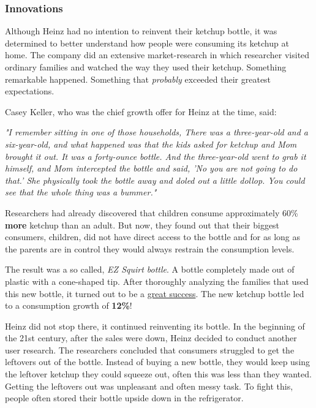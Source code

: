 \subsubsection{Innovations}
Although Heinz had no intention to reinvent their ketchup bottle, it was determined to better understand how people were consuming its ketchup at home. 
The company did an extensive market-research in which researcher visited ordinary families and watched the way they used their ketchup. Something remarkable happened. Something that \textit{probably} exceeded their greatest expectations.

Casey Keller, who was the chief growth offer for Heinz at the time, said: 

\begin{displayquote}
    \textit{
    "I remember sitting in one of those households, There was a three-year-old and a six-year-old, and what happened was that the kids asked for ketchup and Mom brought it out. It was a forty-ounce bottle. And the three-year-old went to grab it himself, and Mom intercepted the bottle and said, 'No you are not going to do that.' She physically took the bottle away and doled out a little dollop. You could see that the whole thing was a bummer."}
\end{displayquote}

Researchers had already discovered that children consume approximately 60\% \textbf{ more} ketchup than an adult. But now, they found out that their biggest consumers, children, did not have direct access to the bottle and for as long as the parents are in control they would always restrain the consumption levels. 

The result was a so called, \textit{EZ Squirt bottle}. A bottle completely made out of plastic with a cone-shaped tip. After thoroughly analyzing the families that used this new bottle, it turned out to be a \underline{great success}. The new ketchup bottle led to a consumption growth of \textbf{12\%}!

Heinz did not stop there, it continued reinventing its bottle. In the beginning of the 21st century, after the sales were down, Heinz decided to conduct another user research. The researchers concluded that consumers struggled to get the leftovers out of the bottle. Instead of buying a new bottle, they would keep using the leftover ketchup they could squeeze out, often this was less than they wanted. Getting the leftovers out was unpleasant and often messy task. To fight this, people often stored their bottle upside down in the refrigerator. 

